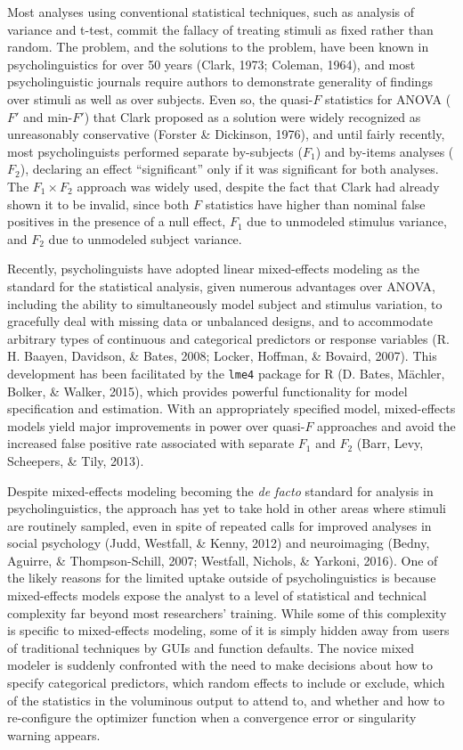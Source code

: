 \documentclass[doc,floatsintext]{apa6}
\begin{document}
Most analyses using conventional statistical techniques, such as
analysis of variance and t-test, commit the fallacy of treating stimuli
as fixed rather than random. The problem, and the solutions to the
problem, have been known in psycholinguistics for over 50 years (Clark,
1973; Coleman, 1964), and most psycholinguistic journals require authors
to demonstrate generality of findings over stimuli as well as over
subjects. Even so, the quasi-\(F\) statistics for ANOVA (\(F'\) and
min-\(F'\)) that Clark proposed as a solution were widely recognized as
unreasonably conservative (Forster \& Dickinson, 1976), and until fairly
recently, most psycholinguists performed separate by-subjects (\(F_1\))
and by-items analyses (\(F_2\)), declaring an effect
\enquote{significant} only if it was significant for both analyses. The
\(F_1 \times F_2\) approach was widely used, despite the fact that Clark
had already shown it to be invalid, since both \(F\) statistics have
higher than nominal false positives in the presence of a null effect,
\(F_1\) due to unmodeled stimulus variance, and \(F_2\) due to unmodeled
subject variance.

Recently, psycholinguists have adopted linear mixed-effects modeling as
the standard for the statistical analysis, given numerous advantages
over ANOVA, including the ability to simultaneously model subject and
stimulus variation, to gracefully deal with missing data or unbalanced
designs, and to accommodate arbitrary types of continuous and
categorical predictors or response variables (R. H. Baayen, Davidson, \&
Bates, 2008; Locker, Hoffman, \& Bovaird, 2007). This development has
been facilitated by the \texttt{lme4} package for R (D. Bates, Mächler,
Bolker, \& Walker, 2015), which provides powerful functionality for
model specification and estimation. With an appropriately specified
model, mixed-effects models yield major improvements in power over
quasi-\(F\) approaches and avoid the increased false positive rate
associated with separate \(F_1\) and \(F_2\) (Barr, Levy, Scheepers, \&
Tily, 2013).

Despite mixed-effects modeling becoming the \emph{de facto} standard for
analysis in psycholinguistics, the approach has yet to take hold in
other areas where stimuli are routinely sampled, even in spite of
repeated calls for improved analyses in social psychology (Judd,
Westfall, \& Kenny, 2012) and neuroimaging (Bedny, Aguirre, \&
Thompson-Schill, 2007; Westfall, Nichols, \& Yarkoni, 2016). One of the
likely reasons for the limited uptake outside of psycholinguistics is
because mixed-effects models expose the analyst to a level of
statistical and technical complexity far beyond most researchers'
training. While some of this complexity is specific to mixed-effects
modeling, some of it is simply hidden away from users of traditional
techniques by GUIs and function defaults. The novice mixed modeler is
suddenly confronted with the need to make decisions about how to specify
categorical predictors, which random effects to include or exclude,
which of the statistics in the voluminous output to attend to, and
whether and how to re-configure the optimizer function when a
convergence error or singularity warning appears.
\end{document}
